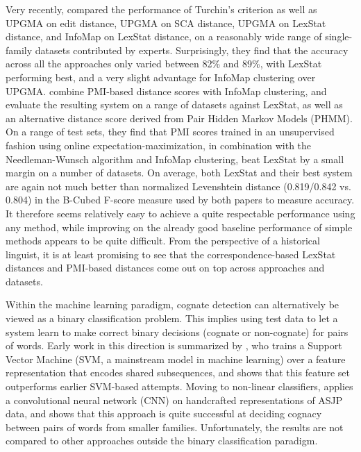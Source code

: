 Very recently, \cite{list_ea_2017} compared the performance of Turchin's criterion as well as UPGMA on edit distance, UPGMA on SCA distance, UPGMA on LexStat distance, and InfoMap on LexStat distance, on a reasonably wide range of single-family datasets contributed by experts. Surprisingly, they find that the accuracy across all the approaches only varied between 82\% and 89\%, with LexStat performing best, and a very slight advantage for InfoMap clustering over UPGMA. \cite{rama_ea_2017} combine PMI-based distance scores with InfoMap clustering, and evaluate the resulting system on a range of datasets against LexStat, as well as an alternative distance score derived from Pair Hidden Markov Models (PHMM). On a range of test sets, they find that PMI scores trained in an unsupervised fashion using online expectation-maximization, in combination with the Needleman-Wunsch algorithm and InfoMap clustering, beat LexStat by a small margin on a number of datasets. On average, both LexStat and their best system are
again not much better than normalized Levenshtein distance (0.819/0.842 vs. 0.804) in the B-Cubed F-score measure used by both papers to measure accuracy. It therefore seems relatively easy to achieve a quite respectable performance using any method, while improving on the already good baseline performance of simple methods appears to be quite difficult. From the perspective of a historical linguist, it is at least promising to see that the correspondence-based LexStat distances and PMI-based distances come out on top across approaches and datasets.

Within the machine learning paradigm, cognate detection can alternatively be viewed as a binary classification problem. This implies using test data to let a system learn to make correct binary decisions (cognate or non-cognate) for pairs of words. Early work in this direction is summarized by \cite{rama2015}, who trains a Support Vector Machine (SVM, a mainstream model in machine learning) over a feature representation that encodes shared subsequences, and shows that this feature set outperforms earlier SVM-based attempts. Moving to non-linear classifiers, \cite{rama2016} applies a convolutional neural network (CNN) on handcrafted representations of ASJP data, and shows that this approach is quite successful at deciding cognacy between pairs of words from smaller families. Unfortunately, the results are not compared to other approaches outside the binary classification paradigm.

